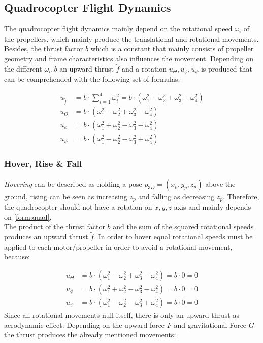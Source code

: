 \newpage 


\subsection{Quadrocopter Flight Dynamics}
The quadrocopter flight dynamics mainly depend on the rotational speed $\omega_i$ of the propellers, 
which mainly produce the translational  and rotational movements. 
Besides, the thrust factor $b$ which is a constant that mainly consists of propeller geometry and frame characteristics also influences the movement. 
Depending on the different $\omega_i, b$ an upward thrust $\tilde{f}$ and a rotation $u_{\Theta}, u_{\phi}, u_{\psi}$ is produced 
that can be comprehended with the following set of formulas:

\begin{align}
	u_{\tilde{f}} &= b \cdot \sum_{i=1}^{4}\omega_i^2 = b \cdot ( \omega_1^2 + \omega_2^2 + \omega_3^2 + \omega_4^2)\label{form:quad}\\
	u_{\Theta} &= b \cdot (\omega_1^2 - \omega_2^2 + \omega_3^2 - \omega_4^2) \label{form:quad2}\\
	u_{\phi} &= b \cdot (\omega_1^2 + \omega_2^2 - \omega_3^2 - \omega_4^2)\label{form:quad3}\\
	u_{\psi} &= b \cdot (\omega_1^2 - \omega_2^2 - \omega_3^2 + \omega_4^2)\label{form:quad4}
\end{align}

\subsubsection{Hover, Rise \& Fall} \label{sec:hover}
\emph{Hovering} can be described as holding a pose $p_{3D} = (x_p, y_p, z_p)$ above the ground, 
rising can be seen as increasing $z_p$ and falling as decreasing $z_p$. 
Therefore, the quadrocopter should not have a rotation on $x,y,z$ axis and mainly depends on \cref{form:quad}.  \\
The product of the thrust factor $b$ and the sum of the squared rotational speeds produces an upward thrust $\tilde{f}$. 
In order to hover equal rotational speeds must be applied to each motor/propeller in order to avoid a rotational movement, because:

\begin{align}
	u_{\Theta} &= b \cdot (\omega_1^2 - \omega_2^2 + \omega_3^2 - \omega_4^2) = b \cdot 0 = 0\\
	u_{\phi} &= b \cdot (\omega_1^2 + \omega_2^2 - \omega_3^2 - \omega_4^2) = b \cdot 0 = 0\\
	u_{\psi} &= b \cdot (\omega_1^2 - \omega_2^2 - \omega_3^2 + \omega_4^2)	= b \cdot 0 = 0
\end{align}
Since all rotational movements null itself, there is only an upward thrust as aerodynamic effect.
Depending on the upward force $F$ and gravitational Force $G$ the thrust produces the already mentioned movements:

